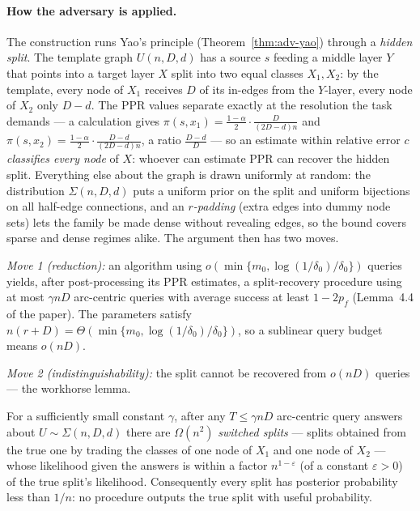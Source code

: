 \paragraph{How the adversary is applied.}
The construction runs Yao's principle (Theorem~\ref{thm:adv-yao}) through a \emph{hidden
split}. The template graph $U(n,D,d)$ has a source $s$ feeding a middle layer $Y$ that points
into a target layer $X$ split into two equal classes $X_1, X_2$: by the template, every node of
$X_1$ receives $D$ of its in-edges from the $Y$-layer, every node of $X_2$ only $D-d$. The PPR
values separate exactly at the resolution the task demands --- a calculation gives
$\pi(s,x_1) = \tfrac{1-\alpha}{2}\cdot\tfrac{D}{(2D-d)n}$ and
$\pi(s,x_2) = \tfrac{1-\alpha}{2}\cdot\tfrac{D-d}{(2D-d)n}$, a ratio $\tfrac{D-d}{D}$ --- so an
estimate within relative error $c$ \emph{classifies every node} of $X$: whoever can estimate
PPR can recover the hidden split. Everything else about the graph is drawn uniformly at random:
the distribution $\Sigma(n,D,d)$ puts a uniform prior on the split and uniform bijections on
all half-edge connections, and an \emph{$r$-padding} (extra edges into dummy node sets) lets
the family be made dense without revealing edges, so the bound covers sparse and dense
regimes alike. The argument then has two moves.

\emph{Move 1 (reduction):} an algorithm using
$o(\min\{m_0, \log(1/\delta_0)/\delta_0\})$ queries yields, after post-processing its PPR
estimates, a split-recovery procedure using at most $\gamma n D$ arc-centric queries with
average success at least $1 - 2p_f$ (Lemma~4.4 of the paper). The parameters satisfy
$n(r+D) = \Theta(\min\{m_0, \log(1/\delta_0)/\delta_0\})$, so a sublinear query budget
means $o(nD)$.

\emph{Move 2 (indistinguishability):} the split cannot be recovered from $o(nD)$ queries ---
the workhorse lemma.

\begin{lemma}
\label{lem:adv-switch}
For a sufficiently small constant $\gamma$, after any $T \le \gamma n D$ arc-centric query
answers about $U \sim \Sigma(n,D,d)$ there are $\Omega(n^2)$ \emph{switched splits} ---
splits obtained from the true one by trading the classes of one node of $X_1$ and one node of
$X_2$ --- whose likelihood given the answers is within a factor $n^{1-\varepsilon}$
(of a constant $\varepsilon > 0$) of the true split's likelihood. Consequently every split has
posterior probability less than $1/n$: no procedure outputs the true split with useful
probability. \eop
\end{lemma}

